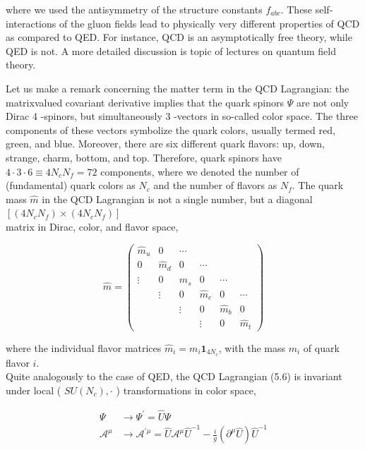 \documentclass[10pt, letterpaper]{article}
\begin{document}
where we used the antisymmetry of the structure constants $f_{a b c}$. These self-interactions of the gluon fields lead to physically very different properties of QCD as compared to QED. For instance, QCD is an asymptotically free theory, while QED is not. A more detailed discussion is topic of lectures on quantum field theory.

Let us make a remark concerning the matter term in the QCD Lagrangian: the matrixvalued covariant derivative implies that the quark spinors $\Psi$ are not only Dirac 4 -spinors, but simultaneously 3 -vectors in so-called color space. The three components of these vectors symbolize the quark colors, usually termed red, green, and blue. Moreover, there are six different quark flavors: up, down, strange, charm, bottom, and top. Therefore, quark spinors have $4 \cdot 3 \cdot 6 \equiv 4 N_{c} N_{f}=72$ components, where we denoted the number of (fundamental) quark colors as $N_{c}$ and the number of flavors as $N_{f}$. The quark mass $\hat{m}$ in the QCD Lagrangian is not a single number, but a diagonal $\left[\left(4 N_{c} N_{f}\right) \times\left(4 N_{c} N_{f}\right)\right]$\\
matrix in Dirac, color, and flavor space,

$$
\hat{m}=\left(\begin{array}{cccccc}
\hat{m}_{u} & 0 & \cdots & & & \\
0 & \hat{m}_{d} & 0 & \cdots & & \\
\vdots & 0 & \hat{m}_{s} & 0 & \cdots & \\
& \vdots & 0 & \hat{m}_{c} & 0 & \cdots \\
& & \vdots & 0 & \hat{m}_{b} & 0 \\
& & & \vdots & 0 & \hat{m}_{t}
\end{array}\right)
$$

where the individual flavor matrices $\hat{m}_{i}=m_{i} \mathbf{1}_{4 N_{c}}$, with the mass $m_{i}$ of quark flavor $i$.\\
Quite analogously to the case of QED, the QCD Lagrangian (5.6) is invariant under local ( $S U\left(N_{c}\right), \cdot$ ) transformations in color space,

$$
\begin{aligned}
\Psi & \longrightarrow \Psi^{\prime}=\hat{U} \Psi \\
\mathcal{A}^{\mu} & \longrightarrow \mathcal{A}^{\prime \mu}=\hat{U} \mathcal{A}^{\mu} \hat{U}^{-1}-\frac{i}{g}\left(\partial^{\mu} \hat{U}\right) \hat{U}^{-1}
\end{aligned}
$$
\end{document}
